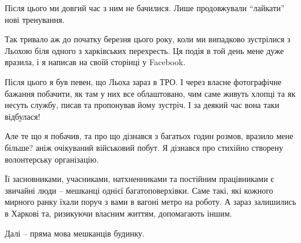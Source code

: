 Після цього ми довгий час з ним не бачилися. Лише продовжували
\enquote{лайкати} нові тренування.

Так тривало аж до початку березня цього року, коли ми випадково зустрілися з
Льохою біля одного з харківських перехресть. Ця подія в той день мене дуже
вразила, і я написав на своїй сторінці у Facebook.

Після цього я був певен, що Льоха зараз в ТРО. І через власне фотографічне
бажання побачити, як там у них все облаштовано, чим саме живуть хлопці та як
несуть службу, писав та пропонував йому зустріч. І за деякий час вона таки
відбулася!

Але те що я побачив, та про що дізнався з багатьох годин розмов, вразило мене
більше? аніж очікуваний військовий побут. Я дізнався про стихійно створену
волонтерську організацію.

Її засновниками, учасниками, натхненниками та постійним працівниками є звичайні
люди – мешканці однієї багатоповерхівки. Саме такі, які кожного мирного ранку
їхали поруч з вами в вагоні метро на роботу. А зараз залишились в Харкові та,
ризикуючи власним життям, допомагають іншим.

Далі – пряма мова мешканців будинку.

